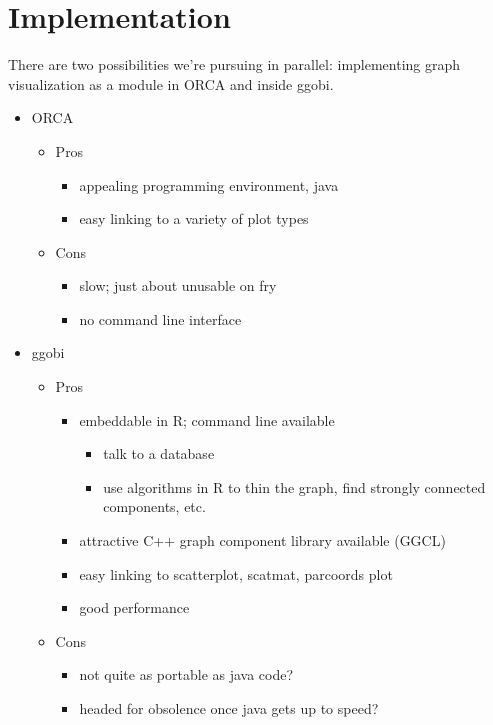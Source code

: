 \documentclass[11pt]{article}
\begin{document}
\section {Implementation}

There are two possibilities we're pursuing in parallel:
implementing graph visualization as a module in ORCA and inside ggobi.


\begin{itemize} \itemsep 0em
\item ORCA  
  \begin{itemize} \itemsep 0em
  \item Pros
    \begin{itemize} \itemsep 0em
    \item appealing programming environment, java
    \item easy linking to a variety of plot types
    \end{itemize}
  \item Cons
    \begin{itemize} \itemsep 0em
    \item slow; just about unusable on fry
    \item no command line interface
    \end{itemize}
  \end{itemize}

\item ggobi
  \begin{itemize} \itemsep 0em
  \item Pros
    \begin{itemize} \itemsep 0em
    \item embeddable in R; command line available
      \begin{itemize} \itemsep 0em
      \item talk to a database 
      \item use algorithms in R to thin the graph, find strongly connected
        components, etc.
      \end{itemize}
    \item attractive C++ graph component library available (GGCL)
    \item easy linking to scatterplot, scatmat, parcoords plot
    \item good performance
    \end{itemize}
  \item Cons
    \begin{itemize} \itemsep 0em
    \item not quite as portable as java code?
    \item headed for obsolence once java gets up to speed?
    \end{itemize}
  \end{itemize}
\end{itemize}
    
\end{document}
